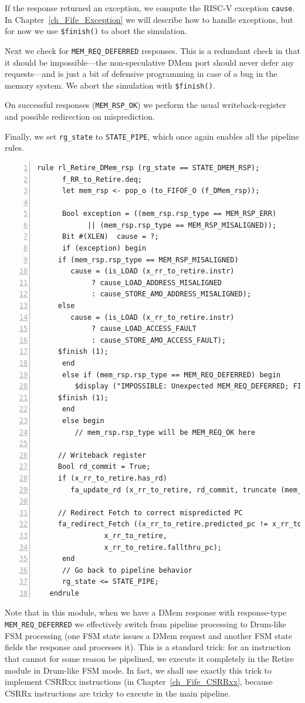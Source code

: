If the response returned an exception, we compute the RISC-V exception
\verb|cause|.  In Chapter~\ref{ch_Fife_Exception} we will describe how
to handle exceptions, but for now we use \verb|$finish()| to abort the
simulation.

Next we check for \verb|MEM_REQ_DEFERRED| responses.  This is a
redundant check in that it should be impossible---the non-speculative
DMem port should never defer any requests---and is just a bit of
defensive programming in case of a bug in the memory system.  We abort
the simulation with \verb|$finish()|.

On successful responses (\verb|MEM_RSP_OK|) we perform the usual
writeback-register and possible redirection on misprediction.

Finally, we set \verb|rg_state| to \verb|STATE_PIPE|, which once again
enables all the pipeline rules.

{\small
\begin{Verbatim}[frame=single, numbers=left, label=(In file:src\_Fife/S5\_Retire.bsv)]
   rule rl_Retire_DMem_rsp (rg_state == STATE_DMEM_RSP);
      f_RR_to_Retire.deq;
      let mem_rsp <- pop_o (to_FIFOF_O (f_DMem_rsp));

      Bool exception = ((mem_rsp.rsp_type == MEM_RSP_ERR)
			|| (mem_rsp.rsp_type == MEM_RSP_MISALIGNED));
      Bit #(XLEN)  cause = ?;
      if (exception) begin
	 if (mem_rsp.rsp_type == MEM_RSP_MISALIGNED)
	    cause = (is_LOAD (x_rr_to_retire.instr)
		     ? cause_LOAD_ADDRESS_MISALIGNED
		     : cause_STORE_AMO_ADDRESS_MISALIGNED);
	 else
	    cause = (is_LOAD (x_rr_to_retire.instr)
		     ? cause_LOAD_ACCESS_FAULT
		     : cause_STORE_AMO_ACCESS_FAULT);
	 $finish (1);
      end
      else if (mem_rsp.rsp_type == MEM_REQ_DEFERRED) begin
         $display ("IMPOSSIBLE: Unexpected MEM_REQ_DEFERRED; FINISH.");
	 $finish (1);
      end
      else begin
      	 // mem_rsp.rsp_type will be MEM_REQ_OK here

	 // Writeback register
	 Bool rd_commit = True;
	 if (x_rr_to_retire.has_rd)
	    fa_update_rd (x_rr_to_retire, rd_commit, truncate (mem_rsp.data));

	 // Redirect Fetch to correct mispredicted PC
	 fa_redirect_Fetch ((x_rr_to_retire.predicted_pc != x_rr_to_retire.fallthru_pc),
			    x_rr_to_retire,
			    x_rr_to_retire.fallthru_pc);
      end
      // Go back to pipeline behavior
      rg_state <= STATE_PIPE;
   endrule
\end{Verbatim}
}

Note that in this module, when we have a DMem response with
response-type \verb|MEM_REQ_DEFERRED| we effectively switch from
pipeline processing to Drum-like FSM processing (one FSM state issues
a DMem request and another FSM state fields the response and processes
it).  This is a standard trick: for an instruction that cannot for
some reason be pipelined, we execute it completely in the Retire
module in Drum-like FSM mode.  In fact, we shall use exactly this
trick to implement CSRRxx instructions (in
Chapter~\ref{ch_Fife_CSRRxx}, because CSRRx instructions are tricky to
execute in the main pipeline.

